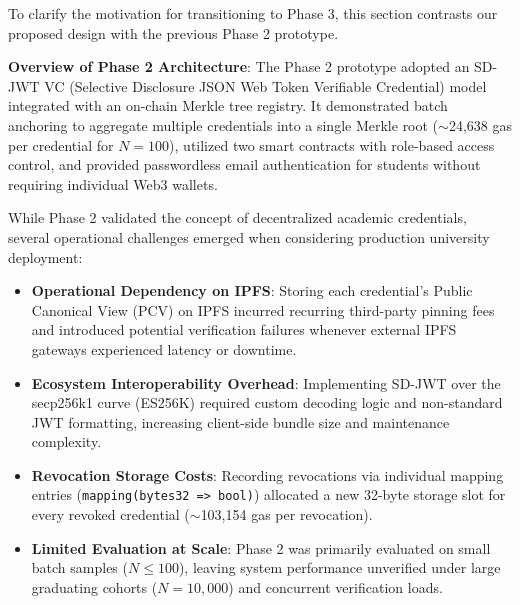 To clarify the motivation for transitioning to Phase 3, this section contrasts our proposed design with the previous Phase 2 prototype.

\textbf{Overview of Phase 2 Architecture}: The Phase 2 prototype adopted an SD-JWT VC (Selective Disclosure JSON Web Token Verifiable Credential) model integrated with an on-chain Merkle tree registry. It demonstrated batch anchoring to aggregate multiple credentials into a single Merkle root ($\sim$24,638 gas per credential for $N=100$), utilized two smart contracts with role-based access control, and provided passwordless email authentication for students without requiring individual Web3 wallets.

While Phase 2 validated the concept of decentralized academic credentials, several operational challenges emerged when considering production university deployment:
\begin{itemize}
    \item \textbf{Operational Dependency on IPFS}: Storing each credential's Public Canonical View (PCV) on IPFS incurred recurring third-party pinning fees and introduced potential verification failures whenever external IPFS gateways experienced latency or downtime.
    \item \textbf{Ecosystem Interoperability Overhead}: Implementing SD-JWT over the secp256k1 curve (ES256K) required custom decoding logic and non-standard JWT formatting, increasing client-side bundle size and maintenance complexity.
    \item \textbf{Revocation Storage Costs}: Recording revocations via individual mapping entries (\texttt{mapping(bytes32 => bool)}) allocated a new 32-byte storage slot for every revoked credential ($\sim$103,154 gas per revocation).
    \item \textbf{Limited Evaluation at Scale}: Phase 2 was primarily evaluated on small batch samples ($N \le 100$), leaving system performance unverified under large graduating cohorts ($N = 10{,}000$) and concurrent verification loads.
\end{itemize}

